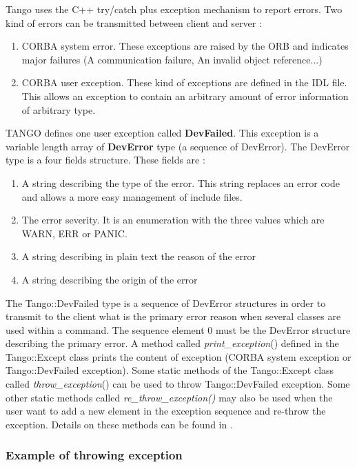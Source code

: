 Tango uses the C++ try/catch plus exception mechanism
to report errors. Two kind of errors can be transmitted between client
and server :
\begin{enumerate}
\item CORBA system error. These exceptions are raised by the ORB and indicates
major failures (A communication failure, An invalid object reference...)
\item CORBA user exception. These kind of exceptions are defined in the
IDL file. This allows an exception to contain an arbitrary amount
of error information of arbitrary type.
\end{enumerate}
TANGO defines one user exception called \textbf{DevFailed}.
This exception is a variable length array of \textbf{DevError}
type (a sequence of DevError). The DevError type is a four fields
structure. These fields are :
\begin{enumerate}
\item A string describing the type of the error. This string replaces an
error code and allows a more easy management of include files.
\item The error severity. It is an enumeration with the three values which
are WARN, ERR or PANIC.
\item A string describing in plain text the reason of the error
\item A string describing the origin of the error
\end{enumerate}
The Tango::DevFailed type is a sequence of DevError structures in
order to transmit to the client what is the primary error reason when
several classes are used within a command. The sequence element 0
must be the DevError structure describing the primary error. A method
called \emph{print\_exception}() defined in
the Tango::Except class prints the content of exception
(CORBA system exception or Tango::DevFailed exception). Some static
methods of the Tango::Except class called \emph{throw\_exception}()
can be used to throw Tango::DevFailed exception. Some other static
methods called \emph{re\_throw\_exception()}
may also be used when the user want to add a new element in the exception
sequence and re-throw the exception. Details on these methods can
be found in \cite{TANGO_ref_man}.

\subsubsection{Example of throwing exception}

